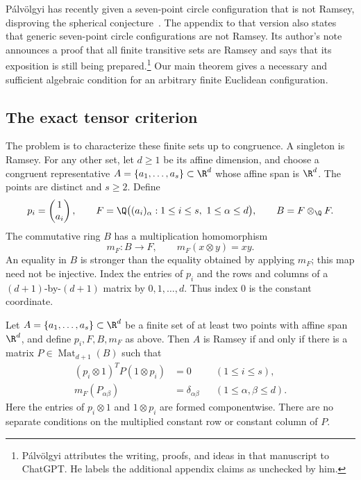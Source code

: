 P\'alv\"olgyi has recently given a seven-point circle configuration
that is not Ramsey, disproving the spherical
conjecture~\cite[Theorem~1]{palvolgyi-heptagon}.
The appendix to that version also states that generic seven-point circle
configurations are not Ramsey. Its author's note announces a proof that
all finite transitive sets are Ramsey and says that its exposition is
still being prepared.\footnote{P\'alv\"olgyi attributes the writing, proofs, and
ideas in that manuscript to ChatGPT. He labels the additional appendix
claims as unchecked by him.}
Our main theorem gives a necessary and sufficient algebraic condition
for an arbitrary finite Euclidean configuration.

\subsection{The exact tensor criterion}

The problem is to characterize these finite sets up to congruence.
A singleton is Ramsey. For any other set, let $d\ge1$ be its affine
dimension, and choose a congruent representative
$A=\{a_1,\ldots,a_s\}\subset\R^d$ whose affine span is $\R^d$.
The points are distinct and $s\ge2$. Define
\[
 p_i=\begin{pmatrix}1\\a_i\end{pmatrix},\qquad
 F=\Q\bigl((a_i)_\alpha:1\le i\le s,\ 1\le\alpha\le d\bigr),
 \qquad B=F\otimes_{\Q}F.
\]
The commutative ring $B$ has a multiplication homomorphism
\[
 m_F:B\longrightarrow F,\qquad m_F(x\otimes y)=xy.
\]
An equality in $B$ is stronger than the equality obtained by applying
$m_F$; this map need not be injective. Index the entries of $p_i$ and
the rows and columns of a $(d+1)$-by-$(d+1)$ matrix by $0,1,\ldots,d$.
Thus index $0$ is the constant coordinate.

\begin{theorem}[Classification]\label{thm:classification}
Let $A=\{a_1,\ldots,a_s\}\subset\R^d$ be a finite set of at least two
points with affine span $\R^d$, and define $p_i,F,B,m_F$ as above.
Then $A$ is Ramsey if and only if there is a matrix
$P\in\operatorname{Mat}_{d+1}(B)$ such that
\begin{align}
 (p_i\otimes1)^T P(1\otimes p_i)&=0
       &&(1\le i\le s),\label{eq:field-evaluations}\\
 m_F(P_{\alpha\beta})&=\delta_{\alpha\beta}
       &&(1\le\alpha,\beta\le d).\label{eq:field-spatial}
\end{align}
Here the entries of $p_i\otimes1$ and $1\otimes p_i$ are formed
componentwise. There are no separate conditions on the multiplied
constant row or constant column of $P$.
\end{theorem}


